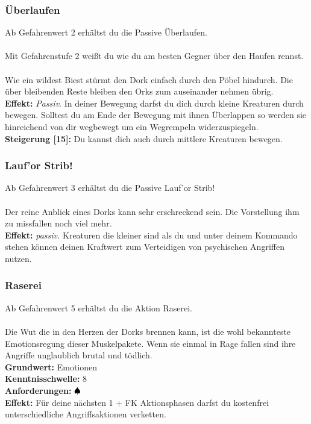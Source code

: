 \subsubsection*{ Überlaufen} \label{sk:überlaufen}
Ab Gefahrenwert 2 erhältst du die Passive Überlaufen.\\
\\
Mit Gefahrenstufe 2 weißt du wie du am besten Gegner über den Haufen rennst.\\ \\
Wie ein wildest Biest stürmt den Dork einfach durch den Pöbel hindurch. Die über bleibenden Reste bleiben den Orks zum auseinander nehmen übrig. \\
\textbf{Effekt:} \textit{Passiv}. In deiner Bewegung darfst du dich durch kleine Kreaturen durch bewegen. Solltest du am Ende der Bewegung mit ihnen Überlappen so werden sie hinreichend von dir wegbewegt um ein Wegrempeln widerzuspiegeln.\\
\textbf{Steigerung [15]:} Du kannst dich auch durch mittlere Kreaturen bewegen.

\subsubsection*{ Lauf'or Strib!} \label{sk:lauforstrib}
Ab Gefahrenwert 3 erhältst du die Passive Lauf'or Strib!\\
\\
Der reine Anblick eines Dorks kann sehr erschreckend sein. Die Vorstellung ihm zu missfallen noch viel mehr.\\
\textbf{Effekt:} \textit{passiv.} Kreaturen die kleiner sind als du und unter deinem Kommando stehen können deinen Kraftwert zum Verteidigen von psychischen Angriffen nutzen.

\subsubsection*{Raserei} \label{sk:raserei}
Ab Gefahrenwert 5 erhältst du die Aktion Raserei.\\
\\
Die Wut die in den Herzen der Dorks brennen kann, ist die wohl bekannteste Emotionsregung dieser Muskelpakete. Wenn sie einmal in Rage fallen sind ihre Angriffe unglaublich brutal und tödlich. \\
\textbf{Grundwert:} Emotionen \\
\textbf{Kenntnisschwelle:} 8 \\
\textbf{Anforderungen:} ${\color{blue} }{\color{black}\spadesuit}$ \\
\textbf{Effekt:} Für deine nächsten 1 + FK Aktionsphasen darfst du kostenfrei unterschiedliche Angriffsaktionen verketten.

